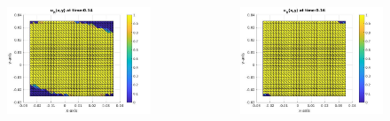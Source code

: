 \documentclass[8pt]{beamer}
\begin{document}
\begin{frame}
\begin{columns}
\begin{column}{0.25\textwidth}
\begin{figure}[h]
				\includegraphics[width=\textwidth]{tc1-2/014.jpg}
			\end{figure}
		\end{column}
		\begin{column}{0.25\textwidth}
			\begin{figure}[h]
				\includegraphics[width=\textwidth]{tc1-2/016.jpg}
			\end{figure}
		\end{column}
	\end{columns}
	\vspace{3mm}
\end{frame}
\end{document}
